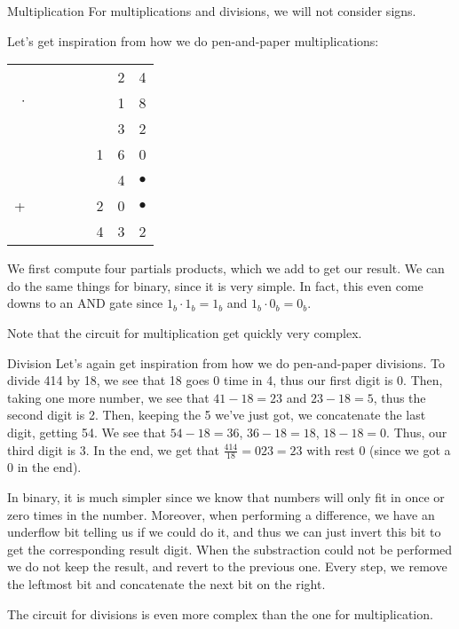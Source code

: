 \documentclass[a4paper]{article}
\begin{document}
\begin{parag}{Multiplication}
    For multiplications and divisions, we will not consider signs. 

    Let's get inspiration from how we do pen-and-paper multiplications:
    \begin{center}
    \begin{tabular}{r@{\,}r@{\,}r@{\,}r@{\,}r@{\,}r@{\,}r@{\,}r@{\,}}
        & & & & & & 2 & 4  \\
        $\cdot$ & & & & & & 1 & 8  \\
        \hline
        & & & & & & 3 & 2  \\
        & & & & & 1 & 6 & 0  \\
        & & & & & & 4 & $\bullet$ \\
        + & & & & & 2 & 0 & $\bullet$ \\
        \hline
          & &  & & & 4 & 3 & 2
    \end{tabular}
    \end{center}

    We first compute four partials products, which we add to get our result. We can do the same things for binary, since it is very simple. In fact, this even come downs to an AND gate since $1_b\cdot 1_b = 1_b$ and $1_b\cdot 0_b = 0_b$.

    Note that the circuit for multiplication get quickly very complex.
\end{parag}

\begin{parag}{Division}
    Let's again get inspiration from how we do pen-and-paper divisions. To divide 414 by 18, we see that 18 goes 0 time in 4, thus our first digit is 0. Then, taking one more number, we see that $41 - 18 = 23$ and $23 - 18 = 5$, thus the second digit is 2. Then, keeping the 5 we've just got, we concatenate the last digit, getting 54. We see that $54 - 18 = 36$, $36 - 18 = 18$, $18 - 18 = 0$. Thus, our third digit is 3. In the end, we get that $\frac{414}{18} = 023 = 23$ with rest 0  (since we got a 0 in the end).

    In binary, it is much simpler since we know that numbers will only fit in once or zero times in the number. Moreover, when performing a difference, we have an underflow bit telling us if we could do it, and thus we can just invert this bit to get the corresponding result digit. When the substraction could not be performed we do not keep the result, and revert to the previous one. Every step, we remove the leftmost bit and concatenate the next bit on the right.

    The circuit for divisions is even more complex than the one for multiplication.
\end{parag}
\end{document}
